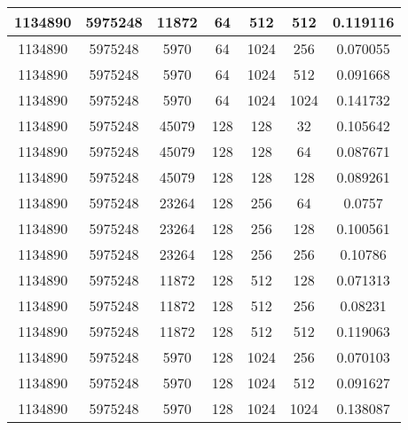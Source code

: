 \documentclass[9pt]{article}
\begin{document}
\begin{tabular}{|c|c|c|c|c|c|c| }
\hline
1134890  & 5975248  & 11872  & 64  & 512  & 512  & 0.119116 \\
\hline
1134890  & 5975248  & 5970  & 64  & 1024  & 256  & 0.070055 \\
\hline
1134890  & 5975248  & 5970  & 64  & 1024  & 512  & 0.091668 \\
\hline
1134890  & 5975248  & 5970  & 64  & 1024  & 1024  & 0.141732 \\
\hline
1134890  & 5975248  & 45079  & 128  & 128  & 32  & 0.105642 \\
\hline
1134890  & 5975248  & 45079  & 128  & 128  & 64  & 0.087671 \\
\hline
1134890  & 5975248  & 45079  & 128  & 128  & 128  & 0.089261 \\
\hline
1134890  & 5975248  & 23264  & 128  & 256  & 64  & 0.0757 \\
\hline
1134890  & 5975248  & 23264  & 128  & 256  & 128  & 0.100561 \\
\hline
1134890  & 5975248  & 23264  & 128  & 256  & 256  & 0.10786 \\
\hline
1134890  & 5975248  & 11872  & 128  & 512  & 128  & 0.071313 \\
\hline
1134890  & 5975248  & 11872  & 128  & 512  & 256  & 0.08231 \\
\hline
1134890  & 5975248  & 11872  & 128  & 512  & 512  & 0.119063 \\
\hline
1134890  & 5975248  & 5970  & 128  & 1024  & 256  & 0.070103 \\
\hline
1134890  & 5975248  & 5970  & 128  & 1024  & 512  & 0.091627 \\
\hline
1134890  & 5975248  & 5970  & 128  & 1024  & 1024  & 0.138087 \\
\hline
\end{tabular}
 
\end{document}
